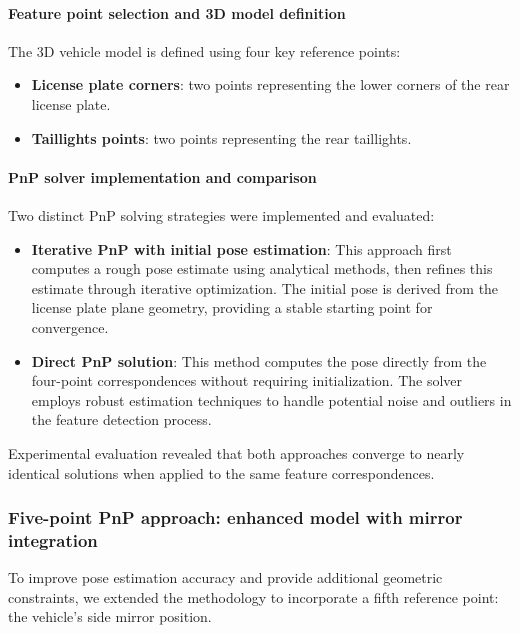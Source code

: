 \paragraph{Feature point selection and 3D model definition}
The 3D vehicle model is defined using four key reference points:
\begin{itemize}
    \item \textbf{License plate corners}: two points representing the lower corners of the rear license plate.
    \item \textbf{Taillights points}: two points representing the rear taillights.
\end{itemize}
\paragraph{PnP solver implementation and comparison}
Two distinct PnP solving strategies were implemented and evaluated:
\begin{itemize}
    \item \textbf{Iterative PnP with initial pose estimation}: This approach first computes a rough pose estimate using analytical methods, then refines this estimate through iterative optimization. The initial pose is derived from the license plate plane geometry, providing a stable starting point for convergence.
    \item \textbf{Direct PnP solution}: This method computes the pose directly from the four-point correspondences without requiring initialization. The solver employs robust estimation techniques to handle potential noise and outliers in the feature detection process.
\end{itemize}

Experimental evaluation revealed that both approaches converge to nearly identical solutions when applied to the same feature correspondences.

\subsubsection{Five-point PnP approach: enhanced model with mirror integration}
To improve pose estimation accuracy and provide additional geometric constraints, we extended the methodology to incorporate a fifth reference point: the vehicle's side mirror position.
